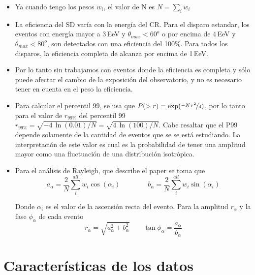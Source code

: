 	\begin{itemize}
		\item Ya cuando tengo los pesos $w_i$, el valor de N es $N=\sum_i w_i$
	
		\item La eficiencia del SD varía con la energía del CR. Para el disparo estandar, los eventos con energía mayor a $3\,$EeV y $\theta_{max}<60^o$ o 	por encima de $4\,$EeV y $\theta_{max}<80^o$, son detectados con una eficiencia del 100\%. Para todos los disparos, la eficiencia completa de 	alcanza por encima de 1\,EeV.
	
		\item Por lo tanto sin trabajamos con eventos donde la eficiencia es completa y sólo puede afectar el cambio de la exposición del observatorio, y  	no es necesario tener en cuenta en el peso la eficiencia.
	
		\item Para calcular el percentil 99, se usa que $P(>r) = \exp(\nicefrac{-N\,r^2}{4})$, por lo tanto para el valor de $r_{99\%}$ del percentil 99 $r	_{99\%}=\sqrt{-4\,\ln(0.01)/N}= \sqrt{4\,\ln(100)/N}$. Cabe resaltar que el P99 depende solamente de la cantidad de eventos que se se está estudiando. La interpretación 	de este valor es cual es la probabilidad de tener una amplitud mayor como una fluctuación de una distribución isotrópica.
	
		\item Para el análisis de Rayleigh, que describe el paper \cite{linsley1975fluctuation} se toma que  
		\begin{equation}
			a_\alpha = \frac{2}{N} \sum^{all}_i w_i \cos(\alpha_i)  \qquad	\qquad	b_\alpha = \frac{2}{N} \sum^{all}_i w_i \sin(\alpha_i)
		\end{equation}
	
		Donde $\alpha_i$ es el valor de la ascensión recta del evento. Para la amplitud  $r_\alpha$ y la fase $\phi_\alpha$ de cada evento
		\begin{equation}
			r_\alpha = \sqrt{a_\alpha^2 +  b_\alpha^2} \qquad \tan{\phi_\alpha} = \frac{a_\alpha}{b_\alpha}
		\end{equation}
	\end{itemize}


	\section{Características de los datos}


